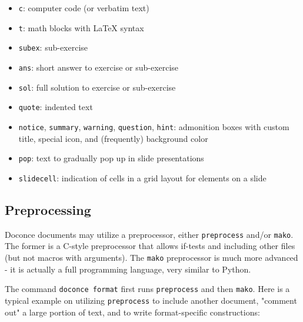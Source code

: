 \documentclass[%
oneside,                 %
final,                   %
10pt]{article}
\begin{document}
\begin{itemize}
 \item \Verb!c!: computer code (or verbatim text)

 \item \Verb!t!: math blocks with {\LaTeX} syntax

 \item \Verb!subex!: sub-exercise

 \item \Verb!ans!: short answer to exercise or sub-exercise

 \item \Verb!sol!: full solution to exercise or sub-exercise

 \item \Verb!quote!: indented text

 \item \Verb!notice!, \Verb!summary!, \Verb!warning!, \Verb!question!, \Verb!hint!: admonition boxes with
    custom title, special icon, and (frequently) background color

 \item \Verb!pop!: text to gradually pop up in slide presentations

 \item \Verb!slidecell!: indication of cells in a grid layout for elements on a
   slide
\end{itemize}

\noindent
\subsection{Preprocessing}

Doconce documents may utilize a preprocessor, either \Verb!preprocess! and/or
\Verb!mako!. The former is a C-style preprocessor that allows if-tests
and including other files (but not macros with arguments).
The \Verb!mako! preprocessor is much more advanced - it is actually a full
programming language, very similar to Python.

The command \Verb!doconce format! first runs \Verb!preprocess! and then \Verb!mako!.
Here is a typical example on utilizing \Verb!preprocess! to include another
document, "comment out" a large portion of text, and to write format-specific
constructions:
\end{document}

